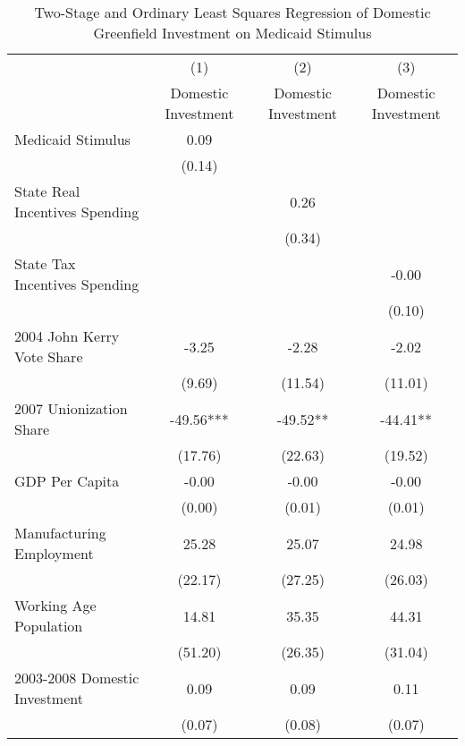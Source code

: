 \begin{table}[!htbp]\centering
\def\sym#1{\ifmmode^{#1}\else\(^{#1}\)\fi}
\caption{Two-Stage and Ordinary Least Squares Regression of Domestic Greenfield Investment on Medicaid Stimulus}
\begin{tabular}{l*{3}{c}}
\hline\hline
                    &\multicolumn{1}{c}{(1)}   &\multicolumn{1}{c}{(2)}   &\multicolumn{1}{c}{(3)}   \\
                    &Domestic Investment   &Domestic Investment   &Domestic Investment   \\
\hline
Medicaid Stimulus   &        0.09   &               &               \\
                    &      (0.14)   &               &               \\
State Real Incentives Spending&               &        0.26   &               \\
                    &               &      (0.34)   &               \\
State Tax Incentives Spending&               &               &       -0.00   \\
                    &               &               &      (0.10)   \\
2004 John Kerry Vote Share&       -3.25   &       -2.28   &       -2.02   \\
                    &      (9.69)   &     (11.54)   &     (11.01)   \\
2007 Unionization Share&      -49.56***&      -49.52** &      -44.41** \\
                    &     (17.76)   &     (22.63)   &     (19.52)   \\
GDP Per Capita      &       -0.00   &       -0.00   &       -0.00   \\
                    &      (0.00)   &      (0.01)   &      (0.01)   \\
Manufacturing Employment&       25.28   &       25.07   &       24.98   \\
                    &     (22.17)   &     (27.25)   &     (26.03)   \\
Working Age Population&       14.81   &       35.35   &       44.31   \\
                    &     (51.20)   &     (26.35)   &     (31.04)   \\
2003-2008 Domestic Investment&        0.09   &        0.09   &        0.11   \\
                    &      (0.07)   &      (0.08)   &      (0.07)   \\

\end{tabular}
\end{table}
